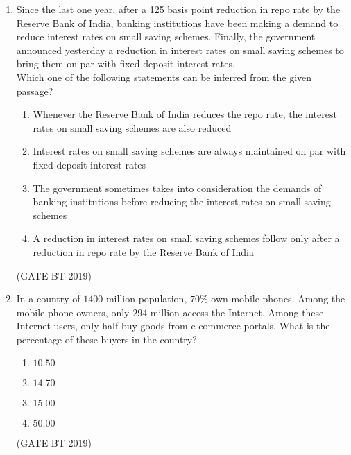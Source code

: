 \documentclass[journal,12pt,onecolumn]{IEEEtran}
\begin{document}
\begin{enumerate}
    \item Since the last one year, after a 125 basis point reduction in repo rate by the Reserve Bank of India, banking institutions have been making a demand to reduce interest rates on small saving schemes. Finally, the government announced yesterday a reduction in interest rates on small saving schemes to bring them on par with fixed deposit interest rates. \\ 
    Which one of the following statements can be inferred from the given passage?
    \begin{enumerate}
        \item Whenever the Reserve Bank of India reduces the repo rate, the interest rates on small saving schemes are also reduced  
        \item Interest rates on small saving schemes are always maintained on par with fixed deposit interest rates  
        \item The government sometimes takes into consideration the demands of banking institutions before reducing the interest rates on small saving schemes  
        \item A reduction in interest rates on small saving schemes follow only after a reduction in repo rate by the Reserve Bank of India  
    \end{enumerate}
    \hfill(GATE BT 2019)

    \item In a country of $1400$ million population, $70\%$ own mobile phones. Among the mobile phone owners, only $294$ million access the Internet. Among these Internet users, only half buy goods from e-commerce portals. What is the percentage of these buyers in the country?
    \begin{multicols}{4}
    \begin{enumerate}
        \item $10.50$  
        \item $14.70$  
        \item $15.00$  
        \item $50.00$  
    \end{enumerate}
    \end{multicols}\hfill(GATE BT 2019)


\end{enumerate}
\end{document}

